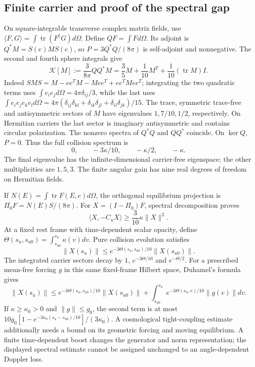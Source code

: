\subsection{Finite carrier and proof of the spectral gap}
On square-integrable transverse complex matrix fields, use
$\langle F,G\rangle=\int\operatorname{tr}(F^\dagger G)d\Omega$.
Define $QF=\int Fd\Omega$. Its adjoint is $Q^*M=S(e)MS(e)$, so $P=3Q^*Q/(8\pi)$ is self-adjoint and nonnegative. The second and fourth sphere integrals give
\begin{equation}
 \mathcal K[M]:=\frac3{8\pi}QQ^*M
 =\frac35M+\frac1{10}M^T+\frac1{10}(\operatorname{tr}M)I.
 \label{ii:thomson_finite_map}
\end{equation}
Indeed $SMS=M-ee^TM-Mee^T+ee^TMee^T$; integrating the two quadratic terms uses $\int e_ie_jd\Omega=4\pi\delta_{ij}/3$, while the last uses
$\int e_ie_je_ke_ld\Omega=4\pi(\delta_{ij}\delta_{kl}+\delta_{ik}\delta_{jl}+\delta_{il}\delta_{jk})/15$.
The trace, symmetric trace-free and antisymmetric sectors of $M$ have eigenvalues $1,7/10,1/2$, respectively. On Hermitian carriers the last sector is imaginary antisymmetric and contains circular polarization. The nonzero spectra of $Q^*Q$ and $QQ^*$ coincide. On $\ker Q$, $P=0$. Thus the full collision spectrum is
\begin{equation}
 0,\qquad -3\kappa/10,\qquad -\kappa/2,\qquad -\kappa.
 \label{ii:thomson_spectrum}
\end{equation}
The final eigenvalue has the infinite-dimensional carrier-free eigenspace; the other multiplicities are $1,5,3$. The finite angular gain has nine real degrees of freedom on Hermitian fields.

If $N(E)=\int\operatorname{tr}F(E,e)d\Omega$, the orthogonal equilibrium projection is
$\Pi_0F=N(E)S/(8\pi)$. For $X=(I-\Pi_0)F$, spectral decomposition proves
\begin{equation}
 \langle X,-C_uX\rangle\ge\frac3{10}\kappa\|X\|^2.
 \label{ii:thomson_coercivity}
\end{equation}
At a fixed rest frame with time-dependent scalar opacity, define
$\Theta(s_u,s_{u0})=\int_{s_{u0}}^{s_u}\kappa(v)dv$. Pure collision evolution satisfies
\begin{equation}
 \|X(s_u)\|\le e^{-3\Theta(s_u,s_{u0})/10}\|X(s_{u0})\|.
 \label{ii:thomson_decay}
\end{equation}
The integrated carrier sectors decay by $1$, $e^{-3\Theta/10}$ and $e^{-\Theta/2}$. For a prescribed mean-free forcing $g$ in this same fixed-frame Hilbert space, Duhamel's formula gives
\begin{equation}
 \|X(s_u)\|\le e^{-3\Theta(s_u,s_{u0})/10}\|X(s_{u0})\|
 +\int_{s_{u0}}^{s_u}e^{-3\Theta(s_u,v)/10}\|g(v)\|dv.
 \label{ii:thomson_forced_bound}
\end{equation}
If $\kappa\ge\kappa_0>0$ and $\|g\|\le g_0$, the second term is at most
$10g_0[1-e^{-3\kappa_0(s_u-s_{u0})/10}]/(3\kappa_0)$.
A cosmological tight-coupling estimate additionally needs a bound on its geometric forcing and moving equilibrium. A finite time-dependent boost changes the generator and norm representation; the displayed spectral estimate cannot be assigned unchanged to an angle-dependent Doppler loss.

